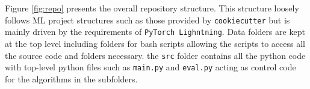 Figure \ref{fig:repo} presents the overall repository structure.
This structure loosely follows ML project structures such as those provided by \texttt{cookiecutter} but is mainly driven by the requirements of \texttt{PyTorch Lighntning}.
Data folders are kept at the top level including folders for bash scripts allowing the scripts to access all the source code and folders necessary.
the \texttt{src} folder contains all the python code with top-level python files such as \texttt{main.py} and \texttt{eval.py} acting as control code for the algorithms in the subfolders.

